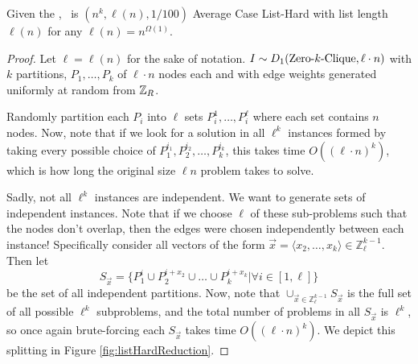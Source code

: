 \begin{theorem}
	Given the \strongzkc, \zkclique~is $(n^k, \ell(n), 1/100)$ Average Case List-Hard with list length $\ell(n)$ for any $\ell(n) = n^{\Omega(1)}$.
	\label{thm:zkcAvgListHard}
\end{theorem}
\begin{proof}
	Let $\ell = \ell(n)$ for the sake of notation. $I \sim D_1(\mbox{Zero-$k$-Clique}, \ell \cdot n)$ with $k$ partitions, $P_1, \ldots, P_k$ of $\ell \cdot n$ nodes each and with edge weights generated uniformly at random from $\mathbb{Z}_R$.
	
	Randomly partition each $P_i$ into $\ell$ sets $P_i^1, \ldots, P_i^\ell$ where each set contains $n$ nodes. Now, note that if we look for a solution in all $\ell^k$ instances formed by taking every possible choice of $P_1^{i_1}, P_2^{i_2},\ldots, P_k^{i_k}$, this takes time $O((\ell\cdot  n)^k)$, which is how long the original size $\ell n$ problem takes to solve. 
	
	Sadly, not all $\ell^k$ instances are independent. We want to generate sets of independent instances. Note that if we choose $\ell$ of these sub-problems such that the nodes don't overlap, then the edges were chosen independently between each instance! Specifically consider all vectors of the form $\vec{x} = \langle x_2, \ldots, x_k\rangle \in \mathbb{Z}_{\ell}^{k-1}$. Then let 
	$$S_{\vec{x}}= \{P_1^i \cup P_2^{i+x_2} \cup \ldots \cup P_k^{i+x_k}|\forall i\in [1,\ell]\}$$
	be the set of all independent partitions. Now, note that $\cup_{\vec{x} \in \mathbb{Z}_\ell^{k-1}} S_{\vec{x}}$ is the full set of all possible $\ell^k$ subproblems, and the total number of problems in all $S_{\vec{x}}$ is $\ell^k$, so once again brute-forcing each $S_{\vec{x}}$ takes time $O((\ell \cdot n)^k)$. We depict this splitting in Figure \ref{fig:listHardReduction}.
	

\end{proof}
